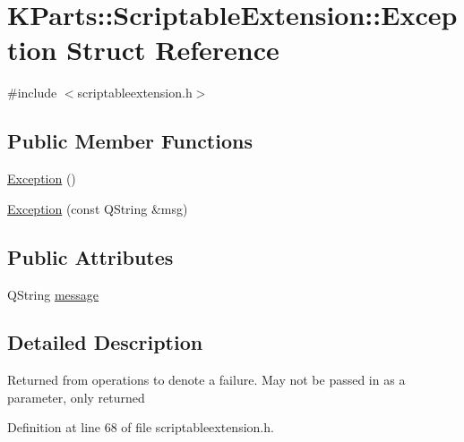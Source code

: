 \hypertarget{structKParts_1_1ScriptableExtension_1_1Exception}{\section{K\+Parts\+:\+:Scriptable\+Extension\+:\+:Exception Struct Reference}
\label{structKParts_1_1ScriptableExtension_1_1Exception}
}


{\ttfamily \#include $<$scriptableextension.\+h$>$}

\subsection*{Public Member Functions}
\begin{DoxyCompactItemize}
\item 
\hyperlink{structKParts_1_1ScriptableExtension_1_1Exception_a0e8550fd8417396956f5b7a4fc78768b}{Exception} ()
\item 
\hyperlink{structKParts_1_1ScriptableExtension_1_1Exception_ac4c4baf6868b49f539c9f7492ce3515d}{Exception} (const Q\+String \&msg)
\end{DoxyCompactItemize}
\subsection*{Public Attributes}
\begin{DoxyCompactItemize}
\item 
Q\+String \hyperlink{structKParts_1_1ScriptableExtension_1_1Exception_aa077475854a1ee79ac8905a2e07be407}{message}
\end{DoxyCompactItemize}


\subsection{Detailed Description}
Returned from operations to denote a failure. May not be passed in as a parameter, only returned 

Definition at line 68 of file scriptableextension.\+h.



